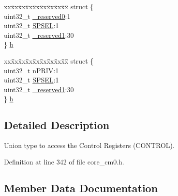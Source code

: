 \begin{DoxyCompactItemize}
\begin{tabbing}
\end{tabbing}\item 
\begin{tabbing}
xx\=xx\=xx\=xx\=xx\=xx\=xx\=xx\=xx\=\kill
struct \{\\
\>uint32\_t \hyperlink{union_c_o_n_t_r_o_l___type_af8c314273a1e4970a5671bd7f8184f50}{\_reserved0}:1\\
\>uint32\_t \hyperlink{union_c_o_n_t_r_o_l___type_a8cc085fea1c50a8bd9adea63931ee8e2}{SPSEL}:1\\
\>uint32\_t \hyperlink{union_c_o_n_t_r_o_l___type_aa7a5662079a447f801034d108f80ce49}{\_reserved1}:30\\
\} \hyperlink{union_c_o_n_t_r_o_l___type_a1da8f5ea1357734dd2b206723e3ed023}{b}\\

\end{tabbing}\item 
\begin{tabbing}
xx\=xx\=xx\=xx\=xx\=xx\=xx\=xx\=xx\=\kill
struct \{\\
\>uint32\_t \hyperlink{union_c_o_n_t_r_o_l___type_a35c1732cf153b7b5c4bd321cf1de9605}{nPRIV}:1\\
\>uint32\_t \hyperlink{union_c_o_n_t_r_o_l___type_a8cc085fea1c50a8bd9adea63931ee8e2}{SPSEL}:1\\
\>uint32\_t \hyperlink{union_c_o_n_t_r_o_l___type_aa7a5662079a447f801034d108f80ce49}{\_reserved1}:30\\
\} \hyperlink{union_c_o_n_t_r_o_l___type_acacca329e6d291cb2b725f59923cdf27}{b}\\

\end{tabbing}\end{DoxyCompactItemize}


\subsection{Detailed Description}
Union type to access the Control Registers (C\+O\+N\+T\+R\+OL). 

Definition at line 342 of file core\+\_\+cm0.\+h.



\subsection{Member Data Documentation}
\mbox{\label{union_c_o_n_t_r_o_l___type_af8c314273a1e4970a5671bd7f8184f50}} 
